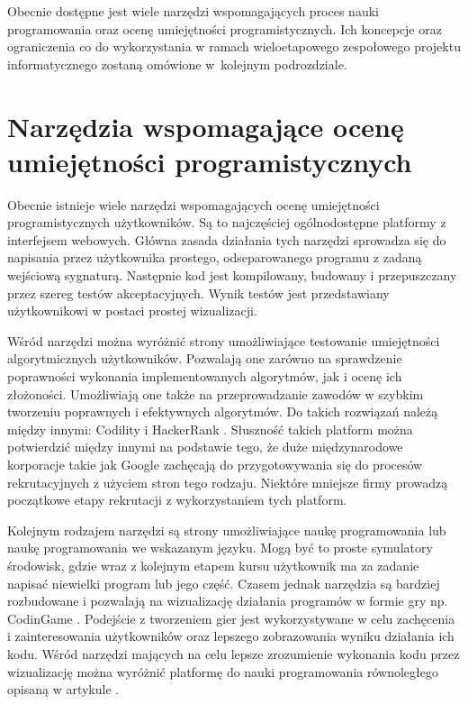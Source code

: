 Obecnie dostępne jest wiele narzędzi wspomagających proces nauki programowania oraz ocenę umiejętności programistycznych.
Ich koncepcje oraz ograniczenia co do wykorzystania w ramach wieloetapowego zespołowego projektu informatycznego zostaną omówione w~kolejnym podrozdziale.

\vfill

\section{Narzędzia wspomagające ocenę umiejętności programistycznych}
\label{tools}

Obecnie istnieje wiele narzędzi wspomagających ocenę umiejętności programistycznych użytkowników.
Są to najczęściej ogólnodostępne platformy z interfejsem webowych.
Główna zasada działania tych narzędzi sprowadza się do napisania przez użytkownika prostego, odseparowanego programu z zadaną wejściową sygnaturą.
Następnie kod jest kompilowany, budowany i przepuszczany przez szereg testów akceptacyjnych.
Wynik testów jest przedstawiany użytkownikowi w postaci prostej wizualizacji.

Wśród narzędzi można wyróżnić strony umożliwiające testowanie umiejętności algorytmicznych użytkowników.
Pozwalają one zarówno na sprawdzenie poprawności wykonania implementowanych algorytmów, jak i ocenę ich złożoności.
Umożliwiają one także na przeprowadzanie zawodów w szybkim tworzeniu poprawnych i efektywnych algorytmów.
Do takich rozwiązań należą między innymi: Codility \cite{codility} i HackerRank \cite{hacker-rank}.
Słuszność takich platform można potwierdzić między innymi na podstawie tego, że duże międzynarodowe korporacje takie jak Google zachęcają do przygotowywania się do procesów rekrutacyjnych z użyciem stron tego rodzaju.
Niektóre mniejsze firmy prowadzą początkowe etapy rekrutacji z wykorzystaniem tych platform.

Kolejnym rodzajem narzędzi są strony umożliwiające naukę programowania lub naukę programowania we wskazanym języku.
Mogą być to proste symulatory środowisk, gdzie wraz z kolejnym etapem kursu użytkownik ma za zadanie napisać niewielki program lub jego część.
Czasem jednak narzędzia są bardziej rozbudowane i pozwalają na wizualizację działania programów w formie gry np. CodinGame \cite{game-coder}.
Podejście z tworzeniem gier jest wykorzystywane w celu zachęcenia i zainteresowania użytkowników oraz lepszego zobrazowania wyniku działania ich kodu.
Wśród narzędzi mających na celu lepsze zrozumienie wykonania kodu przez wizualizację można wyróżnić platformę do nauki programowania równoległego opisaną w artykule \cite{pharaller-platform}.


